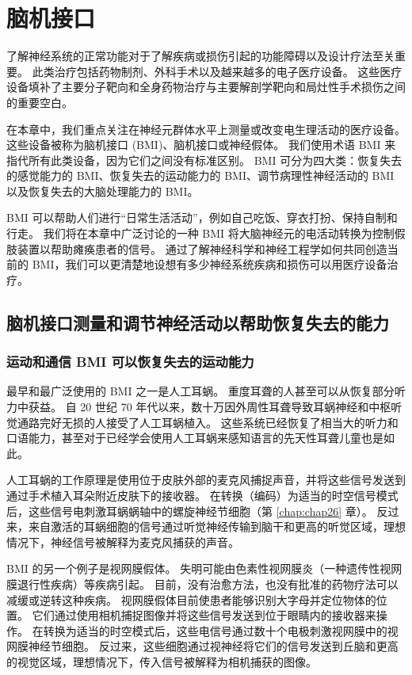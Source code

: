 \chapter{脑机接口} \label{chap:chap39}
了解神经系统的正常功能对于了解疾病或损伤引起的功能障碍以及设计疗法至关重要。 
此类治疗包括药物制剂、外科手术以及越来越多的电子医疗设备。 
这些医疗设备填补了主要分子靶向和全身药物治疗与主要解剖学靶向和局灶性手术损伤之间的重要空白。


在本章中，我们重点关注在神经元群体水平上测量或改变电生理活动的医疗设备。 
这些设备被称为脑机接口 (BMI)、脑机接口或神经假体。 
我们使用术语 BMI 来指代所有此类设备，因为它们之间没有标准区别。 
BMI 可分为四大类：恢复失去的感觉能力的 BMI、恢复失去的运动能力的 BMI、调节病理性神经活动的 BMI 以及恢复失去的大脑处理能力的 BMI。

BMI 可以帮助人们进行“日常生活活动”，例如自己吃饭、穿衣打扮、保持自制和行走。 
我们将在本章中广泛讨论的一种 BMI 将大脑神经元的电活动转换为控制假肢装置以帮助瘫痪患者的信号。 
通过了解神经科学和神经工程学如何共同创造当前的 BMI，我们可以更清楚地设想有多少神经系统疾病和损伤可以用医疗设备治疗。


\section{脑机接口测量和调节神经活动以帮助恢复失去的能力}
\subsection{运动和通信 BMI 可以恢复失去的运动能力}
最早和最广泛使用的 BMI 之一是人工耳蜗。 
重度耳聋的人甚至可以从恢复部分听力中获益。 
自 20 世纪 70 年代以来，数十万因外周性耳聋导致耳蜗神经和中枢听觉通路完好无损的人接受了人工耳蜗植入。 
这些系统已经恢复了相当大的听力和口语能力，甚至对于已经学会使用人工耳蜗来感知语言的先天性耳聋儿童也是如此。


人工耳蜗的工作原理是使用位于皮肤外部的麦克风捕捉声音，并将这些信号发送到通过手术植入耳朵附近皮肤下的接收器。 
在转换（编码）为适当的时空信号模式后，这些信号电刺激耳蜗蜗轴中的螺旋神经节细胞（第 \ref{chap:chap26} 章）。 
反过来，来自激活的耳蜗细胞的信号通过听觉神经传输到脑干和更高的听觉区域，理想情况下，神经信号被解释为麦克风捕获的声音。


BMI 的另一个例子是视网膜假体。 
失明可能由色素性视网膜炎（一种遗传性视网膜退行性疾病）等疾病引起。 
目前，没有治愈方法，也没有批准的药物疗法可以减缓或逆转这种疾病。 
视网膜假体目前使患者能够识别大字母并定位物体的位置。 
它们通过使用相机捕捉图像并将这些信号发送到位于眼睛内的接收器来操作。 
在转换为适当的时空模式后，这些电信号通过数十个电极刺激视网膜中的视网膜神经节细胞。 
反过来，这些细胞通过视神经将它们的信号发送到丘脑和更高的视觉区域，理想情况下，传入信号被解释为相机捕获的图像。


